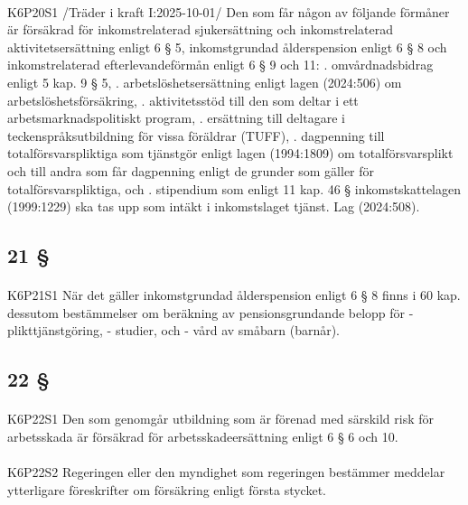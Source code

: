 \documentclass[a4paper,notitlepage,openany,10pt]{book}
\begin{document}
\paragraph*{}
{\tiny K6P20S1}
/Träder i kraft I:2025-10-01/
Den som får någon av följande förmåner är försäkrad för inkomstrelaterad sjukersättning och inkomstrelaterad aktivitetsersättning enligt 6 § 5, inkomstgrundad ålderspension enligt 6 § 8 och inkomstrelaterad efterlevandeförmån enligt 6 § 9 och 11:
. omvårdnadsbidrag enligt 5 kap. 9 § 5,
. arbetslöshetsersättning enligt lagen (2024:506) om arbetslöshetsförsäkring,
. aktivitetsstöd till den som deltar i ett arbetsmarknadspolitiskt program,
. ersättning till deltagare i teckenspråksutbildning för vissa föräldrar (TUFF),
. dagpenning till totalförsvarspliktiga som tjänstgör enligt lagen (1994:1809) om totalförsvarsplikt och till andra som får dagpenning enligt de grunder som gäller för totalförsvarspliktiga, och
. stipendium som enligt 11 kap. 46 § inkomstskattelagen (1999:1229) ska tas upp som intäkt i inkomstslaget tjänst.
Lag (2024:508).
\subsection*{21 §}
\paragraph*{}
{\tiny K6P21S1}
När det gäller inkomstgrundad ålderspension enligt 6 § 8 finns i 60 kap. dessutom bestämmelser om beräkning av pensionsgrundande belopp för
\newline - plikttjänstgöring,
\newline - studier, och
\newline - vård av småbarn (barnår).
\subsection*{22 §}
\paragraph*{}
{\tiny K6P22S1}
Den som genomgår utbildning som är förenad med särskild risk för arbetsskada är försäkrad för arbetsskadeersättning enligt 6 § 6 och 10.
\paragraph*{}
{\tiny K6P22S2}
Regeringen eller den myndighet som regeringen bestämmer meddelar ytterligare föreskrifter om försäkring enligt första stycket.
\end{document}
